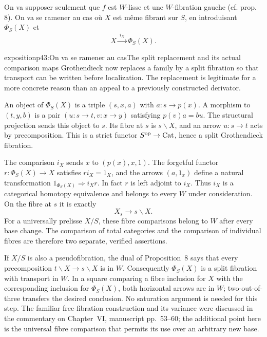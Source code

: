 On va supposer seulement que $f$ est $W$-lisse et une $W$-fibration gauche (cf. prop. 8). On va se ramener au cas où $X$ est même fibrant sur $S$, en introduisant $\Phi_S(X)$ et %
\[ X\xrightarrow{\ i_X\ }\Phi_S(X). \]

\begin{dcomment}{exposition}{p43:On va se ramener au cas}{The split replacement and its actual comparison maps}
Grothendieck now replaces a family by a split fibration so that transport can be written before localization. The replacement is legitimate for a more concrete reason than an appeal to a previously constructed derivator.

An object of $\Phi_S(X)$ is a triple $(s,x,a)$ with $a:s\to p(x)$. A morphism to $(t,y,b)$ is a pair $(u:s\to t,v:x\to y)$ satisfying $p(v)a=bu$. The structural projection sends this object to $s$. Its fibre at $s$ is $s\backslash X$, and an arrow $u:s\to t$ acts by precomposition. This is a strict functor $S^{\mathrm{op}}\to\mathrm{Cat}$, hence a split Grothendieck fibration.

The comparison $i_X$ sends $x$ to $(p(x),x,1)$. The forgetful functor $r:\Phi_S(X)\to X$ satisfies $ri_X=1_X$, and the arrows $(a,1_x)$ define a natural transformation $1_{\Phi_S(X)}\Rightarrow i_Xr$. In fact $r$ is left adjoint to $i_X$. Thus $i_X$ is a categorical homotopy equivalence and belongs to every $W$ under consideration. On the fibre at $s$ it is exactly
\[
 X_s\longrightarrow s\backslash X.
\]
For a universally prelisse $X/S$, these fibre comparisons belong to $W$ after every base change. The comparison of total categories and the comparison of individual fibres are therefore two separate, verified assertions.

If $X/S$ is also a pseudofibration, the dual of Proposition~8 says that every precomposition $t\backslash X\to s\backslash X$ is in $W$. Consequently $\Phi_S(X)$ is a split fibration with transport in $W$. In a square comparing a fibre inclusion for $X$ with the corresponding inclusion for $\Phi_S(X)$, both horizontal arrows are in $W$; two-out-of-three transfers the desired conclusion. No saturation argument is needed for this step. The familiar free-fibration construction and its variance were discussed in the commentary on Chapter~VI, manuscript pp.~53--60; the additional point here is the universal fibre comparison that permits its use over an arbitrary new base.
\end{dcomment}


